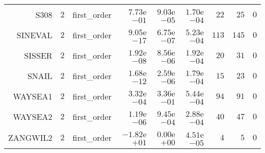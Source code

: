 \begin{longtable}{rrrrrrrrr}
S308 & \(     2\) & first\_order & \( 7.73\)e\(-01\) & \( 9.03\)e\(-05\) & \( 1.70\)e\(-04\) & \(    22\) & \(    25\) & \(     0\) \\
SINEVAL & \(     2\) & first\_order & \( 9.05\)e\(-17\) & \( 6.75\)e\(-07\) & \( 5.23\)e\(-04\) & \(   113\) & \(   145\) & \(     0\) \\
SISSER & \(     2\) & first\_order & \( 1.92\)e\(-08\) & \( 8.56\)e\(-06\) & \( 1.92\)e\(-04\) & \(    20\) & \(    31\) & \(     0\) \\
SNAIL & \(     2\) & first\_order & \( 1.68\)e\(-12\) & \( 2.59\)e\(-06\) & \( 1.79\)e\(-04\) & \(    15\) & \(    23\) & \(     0\) \\
WAYSEA1 & \(     2\) & first\_order & \( 3.32\)e\(-04\) & \( 3.36\)e\(-01\) & \( 5.44\)e\(-04\) & \(    94\) & \(    91\) & \(     0\) \\
WAYSEA2 & \(     2\) & first\_order & \( 1.19\)e\(-06\) & \( 9.45\)e\(-04\) & \( 2.88\)e\(-04\) & \(    40\) & \(    47\) & \(     0\) \\
ZANGWIL2 & \(     2\) & first\_order & \(-1.82\)e\(+01\) & \( 0.00\)e\(+00\) & \( 4.51\)e\(-05\) & \(     4\) & \(     5\) & \(     0\) \\\hline
\end{longtable}
